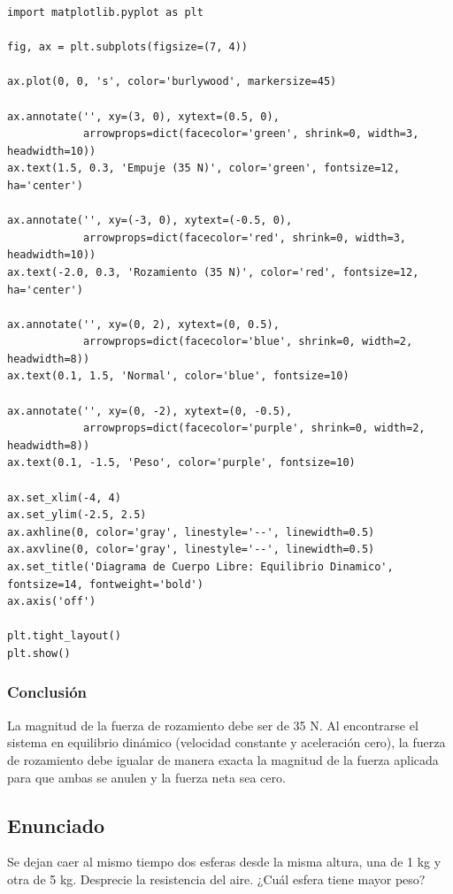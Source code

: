 \documentclass[12pt]{article}
\begin{document}
\begin{lstlisting}
import matplotlib.pyplot as plt

fig, ax = plt.subplots(figsize=(7, 4))

ax.plot(0, 0, 's', color='burlywood', markersize=45)

ax.annotate('', xy=(3, 0), xytext=(0.5, 0), 
            arrowprops=dict(facecolor='green', shrink=0, width=3, headwidth=10))
ax.text(1.5, 0.3, 'Empuje (35 N)', color='green', fontsize=12, ha='center')

ax.annotate('', xy=(-3, 0), xytext=(-0.5, 0), 
            arrowprops=dict(facecolor='red', shrink=0, width=3, headwidth=10))
ax.text(-2.0, 0.3, 'Rozamiento (35 N)', color='red', fontsize=12, ha='center')

ax.annotate('', xy=(0, 2), xytext=(0, 0.5), 
            arrowprops=dict(facecolor='blue', shrink=0, width=2, headwidth=8))
ax.text(0.1, 1.5, 'Normal', color='blue', fontsize=10)

ax.annotate('', xy=(0, -2), xytext=(0, -0.5), 
            arrowprops=dict(facecolor='purple', shrink=0, width=2, headwidth=8))
ax.text(0.1, -1.5, 'Peso', color='purple', fontsize=10)

ax.set_xlim(-4, 4)
ax.set_ylim(-2.5, 2.5)
ax.axhline(0, color='gray', linestyle='--', linewidth=0.5)
ax.axvline(0, color='gray', linestyle='--', linewidth=0.5)
ax.set_title('Diagrama de Cuerpo Libre: Equilibrio Dinamico', fontsize=14, fontweight='bold')
ax.axis('off')

plt.tight_layout()
plt.show()
\end{lstlisting}

\subsubsection*{Conclusión}
La magnitud de la fuerza de rozamiento debe ser de 35 N. Al encontrarse el sistema en equilibrio dinámico (velocidad constante y aceleración cero), la fuerza de rozamiento debe igualar de manera exacta la magnitud de la fuerza aplicada para que ambas se anulen y la fuerza neta sea cero.

\newpage

\subsection*{Enunciado}
Se dejan caer al mismo tiempo dos esferas desde la misma altura, una de 1 kg y otra de 5 kg. Desprecie la resistencia del aire. ¿Cuál esfera tiene mayor peso?
\end{document}
